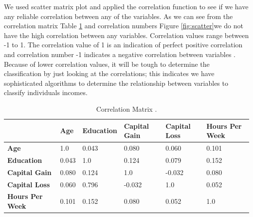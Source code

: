 \documentclass[sigconf]{acmart}
\begin{document}
\par We used scatter matrix plot and applied the correlation function to see if we have any reliable correlation between any of the variables. As we can see from the correlation matrix Table \ref{scatter-matrix} and correlation numbers Figure \ref{fig:scatter}we do not have the high correlation between any variables. Correlation values range between -1 to 1. The correlation value of 1 is an indication of perfect positive correlation and correlation number -1 indicates a negative correlation between variables \cite{www-investopedia}. Because of lower correlation values, it will be tough to determine the classification by just looking at the correlations; this indicates we have sophisticated algorithms to determine the relationship between variables to classify individuals incomes. 

\begin{table}[!ht]
\centering
\begin{tabular}{|l|l|l|l|l|l|}
\hline
                        & \textbf{Age} & \textbf{Education} & \textbf{Capital Gain} & \textbf{Capital Loss} & \textbf{Hours Per Week} \\ \hline
\textbf{Age}            & 1.0          & 0.043              & 0.080                 & 0.060                 & 0.101                   \\ \hline
\textbf{Education}      & 0.043        & 1.0                & 0.124                 & 0.079                 & 0.152                   \\ \hline
\textbf{Capital Gain}   & 0.080        & 0.124              & 1.0                   & -0.032                & 0.080                   \\ \hline
\textbf{Capital Loss}   & 0.060        & 0.796              & -0.032                & 1.0                   & 0.052                   \\ \hline
\textbf{Hours Per Week} & 0.101        & 0.152              & 0.080                 & 0.052                 & 1.0                     \\ \hline
\end{tabular}
\caption{Correlation Matrix \cite{Borga2017}.}
\label{scatter-matrix}
\end{table}
\end{document}
